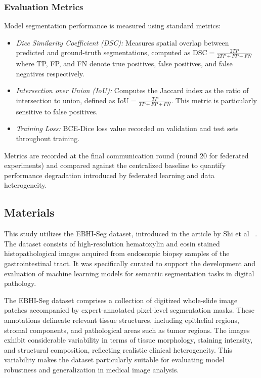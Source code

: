 \documentclass[conference]{IEEEtran}
\begin{document}
\subsubsection{Evaluation Metrics}
Model segmentation performance is measured using standard metrics:

\begin{itemize}
\item \emph{Dice Similarity Coefficient (DSC):} Measures spatial overlap between predicted and ground-truth segmentations, computed as $\text{DSC} = \frac{2TP}{2TP + FP + FN}$ where TP, FP, and FN denote true positives, false positives, and false negatives respectively.

\item \emph{Intersection over Union (IoU):} Computes the Jaccard index as the ratio of intersection to union, defined as $\text{IoU} = \frac{TP}{TP + FP + FN}$. This metric is particularly sensitive to false positives.

\item \emph{Training Loss:} BCE-Dice loss value recorded on validation and test sets throughout training.
\end{itemize}

Metrics are recorded at the final communication round (round 20 for federated experiments) and compared against the centralized baseline to quantify performance degradation introduced by federated learning and data heterogeneity.


\subsection{Materials}
 This study utilizes the EBHI-Seg dataset, introduced in the article by Shi et al ~\cite{dataset}. The dataset consists of high-resolution hematoxylin and eosin stained histopathological images acquired from endoscopic biopsy samples of the gastrointestinal tract. It was specifically curated to support the development and evaluation of machine learning models for semantic segmentation tasks in digital pathology.

The EBHI-Seg dataset comprises a collection of digitized whole-slide image patches accompanied by expert-annotated pixel-level segmentation masks. These annotations delineate relevant tissue structures, including epithelial regions, stromal components, and pathological areas such as tumor regions. The images exhibit considerable variability in terms of tissue morphology, staining intensity, and structural composition, reflecting realistic clinical heterogeneity. This variability makes the dataset particularly suitable for evaluating model robustness and generalization in medical image analysis.
\end{document}
